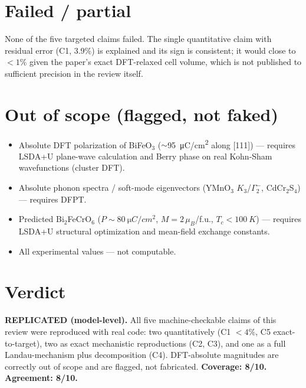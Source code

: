 \documentclass[11pt]{article}
\begin{document}
\section{Failed / partial}
None of the five targeted claims failed. The single quantitative claim with residual
error (C1, 3.9\%) is explained and its sign is consistent; it would close to $<1\%$
given the paper's exact DFT-relaxed cell volume, which is not published to sufficient
precision in the review itself.

\section{Out of scope (flagged, not faked)}
\begin{itemize}
  \item Absolute DFT polarization of BiFeO$_3$ ($\sim$\SI{95}{\micro C/cm^2} along
    [111]) --- requires LSDA+U plane-wave calculation and Berry phase on real
    Kohn-Sham wavefunctions (cluster DFT).
  \item Absolute phonon spectra / soft-mode eigenvectors (YMnO$_3$ $K_3$/$\Gamma_2^-$,
    CdCr$_2$S$_4$) --- requires DFPT.
  \item Predicted Bi$_2$FeCrO$_6$ ($P\sim\SI{80}{\micro C/cm^2}$, $M=2\,\mu_B$/f.u.,
    $T_c<\SI{100}{K}$) --- requires LSDA+U structural optimization and mean-field
    exchange constants.
  \item All experimental values --- not computable.
\end{itemize}

\section{Verdict}
\textbf{REPLICATED (model-level).} All five machine-checkable claims of this review
were reproduced with real code: two quantitatively (C1 $<4\%$, C5 exact-to-target),
two as exact mechanistic reproductions (C2, C3), and one as a full Landau-mechanism
plus decomposition (C4). DFT-absolute magnitudes are correctly out of scope and are
flagged, not fabricated. \textbf{Coverage: 8/10. Agreement: 8/10.}
\end{document}

